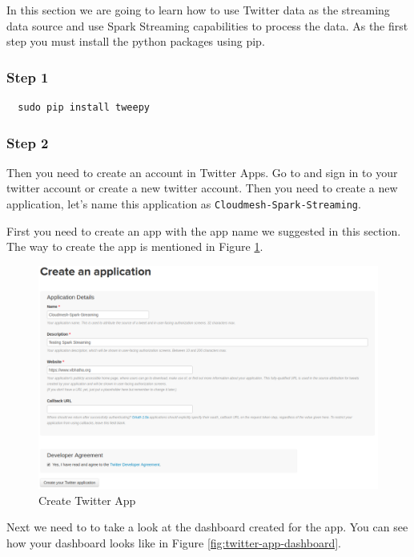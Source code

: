 In this section we are going to learn how to use Twitter data as the streaming data source and use Spark Streaming capabilities to process the data. As the first step you must install the python packages using pip.

\subsubsection{Step 1}

\begin{lstlisting}
  sudo pip install tweepy
\end{lstlisting}

\subsubsection{Step 2}

Then you need to create an account in Twitter Apps. Go to
 and sign in to your twitter account or
create a new twitter account. Then you need to create a new application,
let's name this application as \verb|Cloudmesh-Spark-Streaming|.

First you need to create an app with the app name we suggested in this
section. The way to create the app is mentioned in Figure \ref{fig:twitter-app}.

\begin{figure}[htbp]\label{fig:twitter-app}
\centering
\includegraphics[width=1.0\textwidth]{images/twitter-app.png}
\caption{Create Twitter App}
\end{figure}

Next we need to to take a look at the dashboard created for the app.
You can see how your dashboard looks like in Figure \ref{fig:twitter-app-dashboard}. 

